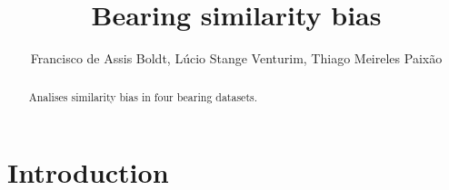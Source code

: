 \documentclass[journal]{IEEEtran}
\title{Bearing similarity bias}
\author{Francisco de Assis Boldt, Lúcio Stange Venturim, Thiago Meireles Paixão}
\begin{document}
\maketitle

\begin{abstract}
    Analises similarity bias in four bearing datasets.
\end{abstract}

\section{Introduction}
\end{document}
